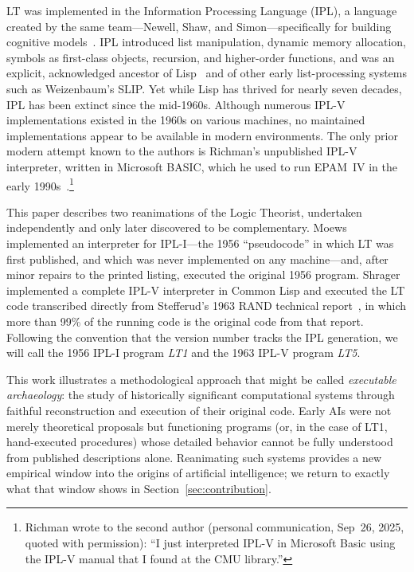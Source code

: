 \documentclass[journal]{IEEEtran}
\begin{document}
LT was implemented in the Information Processing Language (IPL), a
language created by the same team---Newell, Shaw, and
Simon---specifically for building cognitive
models~\cite{newell1964ipl}. IPL introduced list manipulation, dynamic
memory allocation, symbols as first-class objects, recursion, and
higher-order functions, and was an explicit, acknowledged ancestor of
Lisp~\cite{mccarthy1960lisp} and of other early list-processing
systems such as Weizenbaum's SLIP. Yet while Lisp has thrived for
nearly seven decades, IPL has been extinct since the mid-1960s.
Although numerous IPL-V implementations existed in the 1960s on
various machines, no maintained implementations appear to be available
in modern environments. The only prior modern attempt known to the
authors is Richman's unpublished IPL-V interpreter, written in
Microsoft BASIC, which he used to run EPAM~IV in the early
1990s~\cite{richman1995epam}.\footnote{Richman wrote to the second
author (personal communication, Sep~26, 2025, quoted with
permission): ``I just interpreted IPL-V in Microsoft Basic using the
IPL-V manual that I found at the CMU library.''}

This paper describes two reanimations of the Logic Theorist,
undertaken independently and only later discovered to be
complementary. Moews implemented an interpreter for IPL-I---the 1956
``pseudocode'' in which LT was first published, and which was never
implemented on any machine---and, after minor repairs to the printed
listing, executed the original 1956 program. Shrager implemented a
complete IPL-V interpreter in Common Lisp and executed the LT code
transcribed directly from Stefferud's 1963 RAND technical
report~\cite{stefferud1963lt}, in which more than 99\% of the running
code is the original code from that report. Following the convention
that the version number tracks the IPL generation, we will call the
1956 IPL-I program \emph{LT1} and the 1963 IPL-V program \emph{LT5}.

This work illustrates a methodological approach that might be called
\emph{executable archaeology}: the study of historically significant
computational systems through faithful reconstruction and execution of
their original code. Early AIs were not merely theoretical proposals
but functioning programs (or, in the case of LT1, hand-executed
procedures) whose detailed behavior cannot be fully understood from
published descriptions alone. Reanimating such systems provides a new
empirical window into the origins of artificial intelligence; we
return to exactly what that window shows in
Section~\ref{sec:contribution}.
\end{document}
